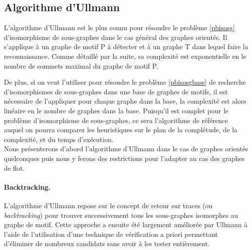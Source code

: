 \subsection{Algorithme d'Ullmann}
L'algorithme d'Ullmann est le plus connu pour résoudre le problème \ref{pbisosg} d'isomorphisme de sous-graphes \cite{Ull76} dans le cas général des graphes orientés. Il s'applique à un graphe de motif P à détecter et à un graphe T dans lequel faire la reconnaissance. Comme détaillé par la suite, sa complexité est exponentielle en le nombre de sommets maximal du graphe de motif P.

De plus, si on veut l'utiliser pour résoudre le problème \ref{pbisosgbase} de recherche d'isomorphismes de sous-graphes dans une base de graphes de motifs, il est nécessaire de l'appliquer pour chaque graphe dans la base, la complexité est alors linéaire en le nombre de graphes dans la base.
Puisqu'il est complet pour le problème d'isomorphisme de sous-graphes, ce sera l'algorithme de référence auquel on pourra comparer les heuristiques sur le plan de la complétude, de la complexité, et du temps d'exécution.\\

Nous présenterons d'abord l'algorithme d'Ullmann dans le cas de graphes orientés quelconques puis nous y ferons des restrictions pour l'adapter au cas des graphes de flot.

\paragraph{Backtracking.}
L'algorithme d'Ullmann repose sur le concept de retour sur traces (ou \emph{backtracking}) pour trouver successivement tous les sous-graphes isomorphes au graphe de motif. 
Cette approche a ensuite été largement améliorée par Ullmann à l'aide de l'utilisation d'une technique de vérification a priori permettant d'éliminer de nombreux candidats sans avoir à les tester entièrement.

